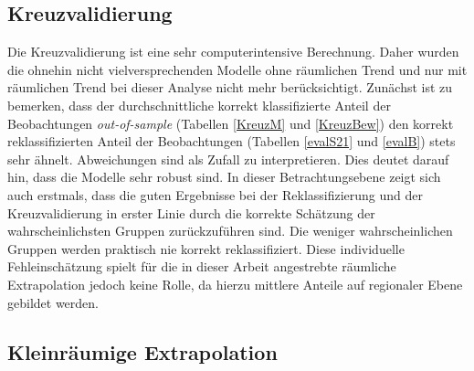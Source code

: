 \documentclass{Vorlage}
\begin{document}
\subsection{Kreuzvalidierung}
Die Kreuzvalidierung ist eine sehr computerintensive Berechnung. Daher wurden die ohnehin nicht vielversprechenden Modelle ohne räumlichen Trend und nur mit räumlichen Trend bei dieser Analyse nicht mehr berücksichtigt. Zunächst ist zu bemerken, dass der durchschnittliche korrekt klassifizierte Anteil der Beobachtungen \textit{out-of-sample} (Tabellen \ref{KreuzM} und \ref{KreuzBew}) den korrekt reklassifizierten Anteil der Beobachtungen (Tabellen \ref{evalS21} und \ref{evalB}) stets sehr ähnelt. Abweichungen sind als Zufall zu interpretieren. Dies deutet darauf hin, dass die Modelle sehr robust sind.
In dieser Betrachtungsebene zeigt sich auch erstmals, dass die guten Ergebnisse bei der Reklassifizierung und der Kreuzvalidierung in erster Linie durch die korrekte Schätzung der wahrscheinlichsten Gruppen zurückzuführen sind. Die weniger wahrscheinlichen Gruppen werden praktisch nie korrekt reklassifiziert. Diese individuelle Fehleinschätzung spielt für die in dieser Arbeit angestrebte räumliche Extrapolation jedoch keine Rolle, da hierzu mittlere Anteile auf regionaler Ebene gebildet werden.

\subsection{Kleinräumige Extrapolation}
\end{document}

